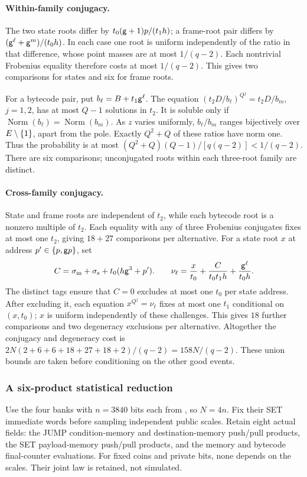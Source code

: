 \paragraph{Within-family conjugacy.} The two state roots differ by $t_0(\mathsf{g}+1)p/(t_1h)$; a frame-root pair differs by $(\mathsf{g}^\ell+\mathsf{g}^m)/(t_0h)$. In each case one root is uniform independently of the ratio in that difference, whose point masses are at most $1/(q-2)$. Each nontrivial Frobenius equality therefore costs at most $1/(q-2)$. This gives two comparisons for states and six for frame roots.

For a bytecode pair, put $b_\ell=B+t_1\mathsf{g}^\ell$. The equation $(t_2D/b_\ell)^{Q^j}=t_2D/b_m$, $j=1,2$, has at most $Q-1$ solutions in $t_2$. It is soluble only if $\operatorname{Norm}(b_\ell)=\operatorname{Norm}(b_m)$. As $z$ varies uniformly, $b_\ell/b_m$ ranges bijectively over $E\setminus\{1\}$, apart from the pole. Exactly $Q^2+Q$ of these ratios have norm one. Thus the probability is at most $(Q^2+Q)(Q-1)/[q(q-2)]<1/(q-2)$. There are six comparisons; unconjugated roots within each three-root family are distinct.

\paragraph{Cross-family conjugacy.} State and frame roots are independent of $t_2$, while each bytecode root is a nonzero multiple of $t_2$. Each equality with any of three Frobenius conjugates fixes at most one $t_2$, giving $18+27$ comparisons per alternative. For a state root $x$ at address $p'\in\{p,\mathsf{g} p\}$, set
\[
 C=\sigma_{\rm m}+\sigma_{\rm s}+t_0(h\mathsf{g}^3+p').
 \qquad
 \nu_\ell=\frac{x}{t_0}+\frac{C}{t_0t_1h}+\frac{\mathsf{g}^\ell}{t_0h}.
\]
The distinct tags ensure that $C=0$ excludes at most one $t_0$ per state address. After excluding it, each equation $x^{Q^j}=\nu_\ell$ fixes at most one $t_1$ conditional on $(x,t_0)$; $x$ is uniform independently of these challenges. This gives $18$ further comparisons and two degeneracy exclusions per alternative. Altogether the conjugacy and degeneracy cost is $2N(2+6+6+18+27+18+2)/(q-2)=158N/(q-2)$. These union bounds are taken before conditioning on the other good events.

\subsubsection{A six-product statistical reduction}

Use the four banks with $n=3840$ bits each from , so $N=4n$. Fix their SET immediate words before sampling independent public scales. Retain eight actual fields: the JUMP condition-memory and destination-memory push/pull products, the SET payload-memory push/pull products, and the memory and bytecode final-counter evaluations. For fixed coins and private bits, none depends on the scales. Their joint law is retained, not simulated.

